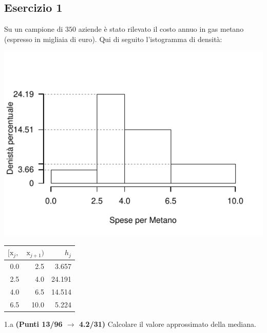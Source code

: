 \documentclass[
  11pt,
]{book}
\theoremstyle{mytheoremstyle}
\theoremstyle{mydefstyle}
\begin{document}
\subsection{Esercizio 1}\label{esercizio-1-7}

Su un campione di \(350\) aziende è stato rilevato il costo annuo in gas metano (espresso in migliaia di euro). Qui di seguito l'istogramma di densità:

\begin{center}\includegraphics{Esami_passati_con_soluzioni_files/figure-latex/2021-69-1} \end{center}

\begin{table}[H]
\centering
\begin{tabular}{rrr}
\toprule
$[\text{x}_j,$ & $\text{x}_{j+1})$ & $h_j$\\
\midrule
0.0 & 2.5 & 3.657\\
2.5 & 4.0 & 24.191\\
4.0 & 6.5 & 14.514\\
6.5 & 10.0 & 5.224\\
\bottomrule
\end{tabular}
\end{table}

1.a \textbf{(Punti 13/96 \(\rightarrow\) 4.2/31)} Calcolare il valore approssimato della mediana.
\end{document}
